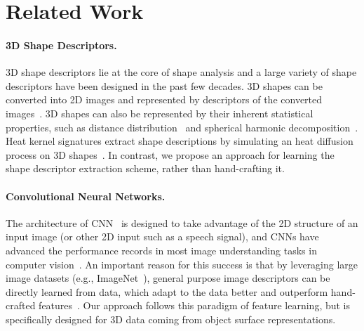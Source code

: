 \documentclass{article}
\begin{document}
\section{Related Work}
\label{sec:related_work}

\vspace{-0.2cm}

\paragraph{3D Shape Descriptors.} 3D shape descriptors lie at the core of shape analysis and a large variety of shape descriptors have been designed in the past few decades. 3D shapes can be converted into 2D images and represented by descriptors of the converted images~\cite{Johnson_TPAMI99_Using,Chen_CGF03_On}. 3D shapes can also be represented by their inherent statistical properties, such as distance distribution~\cite{Osada_ToG02_Shape} and spherical harmonic decomposition~\cite{Kazhdan_SGP03_Rotation}. Heat kernel signatures extract shape descriptions by simulating an heat diffusion process on 3D shapes~\cite{Sun_SGP09_A,Bronstein_ToG11_Shape}. In contrast, we propose an approach for learning the shape descriptor extraction scheme, rather than hand-crafting it.

\vspace{-0.1cm}

\paragraph{Convolutional Neural Networks.} The architecture of CNN~\cite{Lecun_IEEE98_Gradient} is designed to take advantage of the 2D structure of an input image (or other 2D input such as a speech signal), and CNNs have advanced the performance records in most image understanding tasks in computer vision~\cite{Russakovsky_IJCV15_ImageNet}. An important reason for this success is that by leveraging large image datasets (e.g., ImageNet~\cite{Deng_CVPR09_ImageNet}), general purpose image descriptors can be directly learned from data, which adapt to the data better and outperform hand-crafted features~\cite{LeCun_Nature15_Deep}. Our approach follows this paradigm of feature learning, but is specifically designed for 3D data coming from object surface representations.
\end{document}

